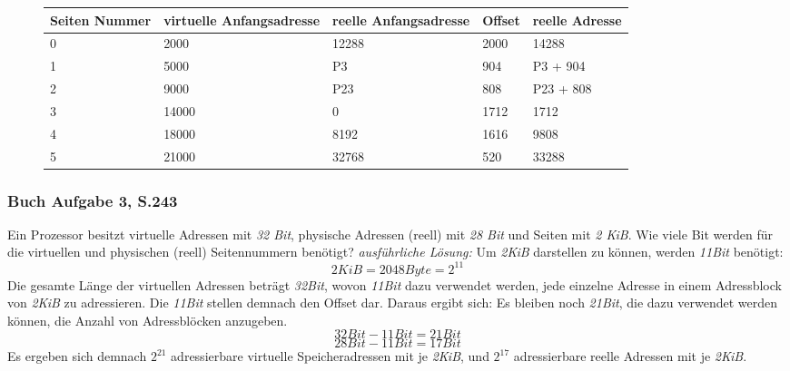 \documentclass[12pt,a4paper]{article}
\begin{document}
\begin{figure}[h]
\begin{tabularx}{17cm}{| X | X | X | X | X |}
\hline 
\small{Seiten Nummer} & \small{virtuelle Anfangsadresse} & \small{reelle Anfangsadresse} & \small{Offset} & \small{reelle Adresse} \\
\hline
0 & 2000 & 12288 & 2000 & 14288 \\
\hline
1 & 5000 & P3 & 904 & P3 + 904 \\
\hline
2 & 9000 & P23 & 808 & P23 + 808 \\
\hline
3 & 14000 & 0 & 1712 & 1712 \\
\hline
4 & 18000 & 8192 & 1616 & 9808 \\
\hline
5 & 21000 & 32768 & 520 & 33288 \\
\hline
\end{tabularx}
\end{figure}
\subsubsection{Buch Aufgabe 3, S.243}
Ein Prozessor besitzt virtuelle Adressen mit \textit{32 Bit}, physische Adressen (reell) mit \textit{28 Bit} und Seiten mit \textit{2 KiB}.\newline
Wie viele Bit werden für die virtuellen und physischen (reell) Seitennummern benötigt?\newline \newline
\noindent \textit{ausführliche Lösung:} \newline
Um \textit{2KiB} darstellen zu können, werden \textit{11Bit} benötigt:
\begin{equation*}
2KiB = 2048Byte = 2^{11}
\end{equation*}
Die gesamte Länge der virtuellen Adressen beträgt \textit{32Bit}, wovon \textit{11Bit} dazu verwendet werden, jede einzelne Adresse in einem Adressblock von \textit{2KiB} zu adressieren. Die \textit{11Bit} stellen demnach den Offset dar. Daraus ergibt sich:\newline
Es bleiben noch \textit{21Bit}, die dazu verwendet werden können, die Anzahl von Adressblöcken anzugeben.
\begin{equation*}
32Bit - 11Bit = 21Bit
\end{equation*}
\begin{equation*}
28Bit - 11Bit = 17Bit
\end{equation*}
Es ergeben sich demnach $2^{21}$ adressierbare virtuelle Speicheradressen mit je \textit{2KiB},\newline
und $2^{17}$ adressierbare reelle Adressen mit je \textit{2KiB}.
\end{document}
